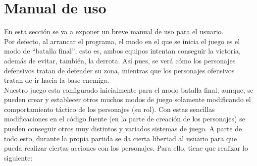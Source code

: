 \medskip
\section{Manual de uso}
En esta sección se va a exponer un breve manual de uso para el usuario. \\

Por defecto, al arrancar el programa, el modo en el que se inicia el juego es el modo de ``batalla final''; esto es, ambos equipos intentan conseguir la victoria, además de evitar, también, la derrota. Así pues, se verá cómo los personajes defensivos tratan de defender su zona, mientras que los personajes ofensivos tratan de ir hacia la base enemiga. \\

Nuestro juego esta configurado inicialmente para el modo batalla final, aunque, se pueden crear y establecer otros muchos modos de juego solamente modificando el comportamiento táctico de los personajes (su rol). Con estas sencillas modificaciones en el código fuente (en la parte de creación de los personajes) se pueden conseguir otros muy distintos y variados sistemas de juego. A parte de todo esto, durante la propia partida se da cierta libertad al usuario para que pueda realizar ciertas acciones con los personajes. Para ello, tiene que realizar lo siguiente:

